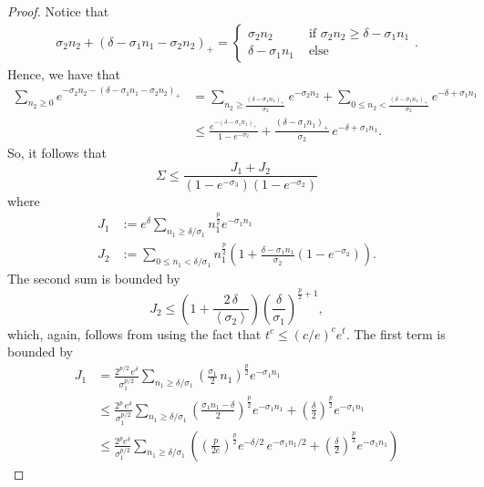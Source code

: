 \documentclass[11pt]{amsart}
\theoremstyle{plain}
\theoremstyle{definition}
\newcommand		{\lt}			{\left}				%
\newcommand		{\rt}			{\right}			%
\renewcommand	{\(}			{\lt(}
\renewcommand	{\)}			{\rt)}
\newcommand		{\bangle}[1]	{\lt\langle #1\rt\rangle}
\newcommand		{\weight}[1]	{\bangle{#1}}	%
\begin{document}
\begin{proof}
		Notice that 
        \begin{align*}
        \sigma_2 n_2 + (\delta - \sigma_1 n_1 - \sigma_2 n_2)_+=
            \begin{cases}
                \sigma_2 n_2 & \text{ if } \sigma_2 n_2 \geq \delta -\sigma_1 n_1
                \\
                \delta-\sigma_1 n_1 & \text{ else}
            \end{cases}.
        \end{align*}
        Hence, we have that
		\begin{align*}
			\sum_{n_2\geq 0} e^{-\sigma_2 n_2 - (\delta-\sigma_1 n_1-\sigma_2 n_2)_+} &= \sum_{n_2\geq \frac{(\delta-\sigma_1 n_1)_+}{\sigma_2}} e^{-\sigma_2 n_2} + \sum_{0\leq n_2 < \frac{(\delta-\sigma_1 n_1)_+}{\sigma_2}} e^{ - \delta+\sigma_1 n_1}
			\\
			&\leq \frac{e^{- (\delta-\sigma_1 n_1)_+}}{1-e^{-\sigma_2}} +  \frac{(\delta-\sigma_1 n_1)_+}{\sigma_2} \, e^{- \delta+\sigma_1 n_1} .
		\end{align*}
		So, it follows that
		\begin{equation*}
			\Sigma \leq \frac{J_1 + J_2}{\lt(1-e^{-\sigma_3}\rt)\lt(1-e^{-\sigma_2}\rt)}
		\end{equation*}
		where
		\begin{align*}
			J_1 &:= e^\delta \sum_{n_1\geq \delta/\sigma_1}  n_1^\frac{p}{2} e^{-\sigma_1 n_1}
			\\
			J_2 &:= \sum_{0\leq n_1 < \delta/\sigma_1}  n_1^\frac{p}{2} \lt(1 + \frac{\delta-\sigma_1 n_1}{\sigma_2}\lt(1-e^{-\sigma_2}\rt)\rt) .
		\end{align*}
		The second sum is bounded by
		\begin{equation*}
			J_2 \leq \lt(1+\frac{2\,\delta}{\weight{\sigma_2}}\rt) \lt(\frac{\delta}{\sigma_1}\rt)^{\frac{p}{2}+1} ,
		\end{equation*}
		which, again, follows from using the fact that $t^c \leq \lt(c/e\rt)^c e^t$. The first term is bounded by
		\begin{align*}
			J_1 &= \frac{2^{p/2}\,e^\delta}{\sigma_1^{p/2}}\sum_{n_1\geq \delta/\sigma_1} \lt(\tfrac{\sigma_1}{2}\,n_1\rt)^\frac{p}{2} e^{-\sigma_1 n_1}
			\\
			&\leq \frac{2^{p}\,e^\delta}{\sigma_1^{p/2}} \sum_{n_1\geq \delta/\sigma_1} \lt(\tfrac{\sigma_1 n_1 - \delta}{2}\rt)^\frac{p}{2} e^{-\sigma_1 n_1} + \lt(\tfrac{\delta}{2}\rt)^\frac{p}{2} e^{-\sigma_1 n_1}
			\\
			&\leq \frac{2^p e^\delta}{\sigma_1^{p/2}}\sum_{n_1\geq \delta/\sigma_1} \lt(\lt(\tfrac{p}{2e}\rt)^\frac{p}{2} e^{-\delta/2}\, e^{-\sigma_1 n_1/2} + \lt(\tfrac{\delta}{2}\rt)^\frac{p}{2} e^{-\sigma_1 n_1} \rt)

\end{align*}
\end{proof}
\end{document}

